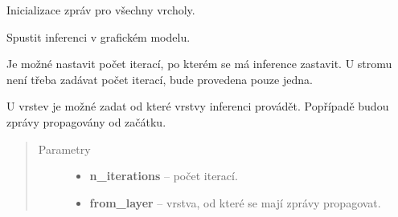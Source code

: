 \begin{fulllineitems}
\begin{fulllineitems}
\end{fulllineitems}


\begin{fulllineitems}
\label{alex.infer:alex.infer.factor.alex.infer.lbp.LBP.init_messages}
Inicializace zpráv pro všechny vrcholy.

\end{fulllineitems}


\begin{fulllineitems}
\label{alex.infer:alex.infer.factor.alex.infer.lbp.LBP.run}\pysiglinewithargsret{\bfcode{run}}{\emph{n\_iterations=1, from\_layer{]}}}{}
Spustit inferenci v grafickém modelu.

Je možné nastavit počet iterací, po kterém se má inference zastavit.
U stromu není třeba zadávat počet iterací, bude provedena pouze jedna.

U vrstev je možné zadat od které vrstvy inferenci provádět.
Popřípadě budou zprávy propagovány od začátku.
\begin{quote}\begin{description}
\item[{Parametry}] \leavevmode\begin{itemize}
\item {} 
\textbf{n\_iterations} -- počet iterací.

\item {} 
\textbf{from\_layer} -- vrstva, od které se mají zprávy propagovat.

\end{itemize}

\end{description}\end{quote}

\end{fulllineitems}


\end{fulllineitems}
